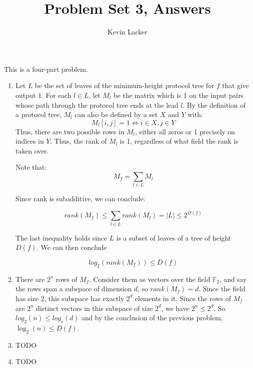 \documentclass{article}
\newenvironment{problem}[2][Problem]{\begin{trivlist}
\item[\hskip \labelsep {\bfseries #1}\hskip \labelsep {\bfseries #2.}]}{\end{trivlist}}
\begin{document}
\title{Problem Set 3, Answers}
\author{Kevin Lacker}
\maketitle

\begin{problem}{1}
  This is a four-part problem.
  \begin{enumerate}
    \item Let $L$ be the set of leaves of the minimum-height protocol
      tree for $f$ that
      give output 1. For each $l \in L$, let $M_l$ be the matrix which
      is 1 on the input pairs whose path through the protocol tree
      ends at the lead $l$. By the definition of a protocol tree,
      $M_l$ can also be defined by a set $X$ and $Y$ with:
      \begin{equation}
        M_l[i,j] = 1 \iff i \in X, j \in Y
      \end{equation}
      Thus, there are two possible rows in
      $M_l$, either all zeros or 1 precisely on indices in $Y$. Thus,
      the rank of $M_l$ is 1, regardless of what field the rank is
      taken over.

      Note that:
      \begin{equation}
        M_f = \sum_{l \in L} M_l
      \end{equation}

      Since rank is subadditive, we can conclude:

      \begin{equation}
        rank(M_f) \leq \sum_{l \in L} rank(M_l) = |L| \leq 2^{D(f)}
      \end{equation}

      The last inequality holds since $L$ is a subset of leaves of a
      tree of height $D(f)$. We can then conclude

      \begin{equation}
        log_2(rank(M_f)) \leq D(f)
      \end{equation}
    \item There are $2^n$ rows of $M_f$. Consider them as vectors over the field
      $\mathbb{F}_2$, and say the rows span a
      subspace of dimension $d$, so $rank(M_f) = d$. Since the field has size 2, this
      subspace has exactly $2^d$ elements in
      it. Since the rows of $M_f$ are $2^n$ distinct vectors in this
      subspace of size $2^d$, we have $2^n \leq 2^d$. So
      $log_2(n) \leq log_s(d)$ and by the conclusion of the previous
      problem, $\log_2(n) \leq D(f)$.
    \item TODO
    \item TODO
  \end{enumerate}
\end{problem}
\end{document}
